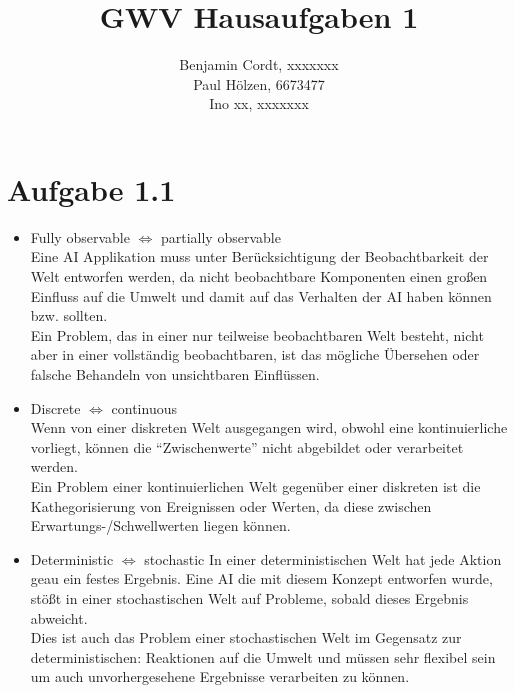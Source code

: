 \documentclass[12pt, paper=a4]{article}
\author{Benjamin Cordt, xxxxxxx\\Paul Hölzen, 6673477\\Ino xx, xxxxxxx}
\title{GWV Hausaufgaben 1}
\begin{document}
\maketitle

\section*{Aufgabe 1.1}
\begin{itemize}
\item Fully observable $\Leftrightarrow$ partially observable\\
      Eine AI Applikation muss unter Berücksichtigung der Beobachtbarkeit der Welt entworfen werden, da
      nicht beobachtbare Komponenten einen großen Einfluss auf die Umwelt und damit auf das Verhalten der
      AI haben können bzw. sollten.\\
      Ein Problem, das in einer nur teilweise beobachtbaren Welt besteht, nicht aber in einer vollständig
      beobachtbaren, ist das mögliche Übersehen oder falsche Behandeln von unsichtbaren Einflüssen.
\item Discrete $\Leftrightarrow$ continuous\\
      Wenn von einer diskreten Welt ausgegangen wird, obwohl eine kontinuierliche vorliegt, können die
      ``Zwischenwerte'' nicht abgebildet oder verarbeitet werden.\\
      Ein Problem einer kontinuierlichen Welt gegenüber einer diskreten ist die Kathegorisierung von
      Ereignissen oder Werten, da diese zwischen Erwartungs-/Schwellwerten liegen können.
\item Deterministic $\Leftrightarrow$ stochastic
      In einer deterministischen Welt hat jede Aktion geau ein festes Ergebnis. Eine AI die mit diesem
      Konzept entworfen wurde, stößt in einer stochastischen Welt auf Probleme, sobald dieses Ergebnis
      abweicht.\\
      Dies ist auch das Problem einer stochastischen Welt im Gegensatz zur deterministischen: Reaktionen
      auf die Umwelt und müssen sehr flexibel sein um auch unvorhergesehene Ergebnisse verarbeiten zu
      können.
\end{itemize}
\end{document}
